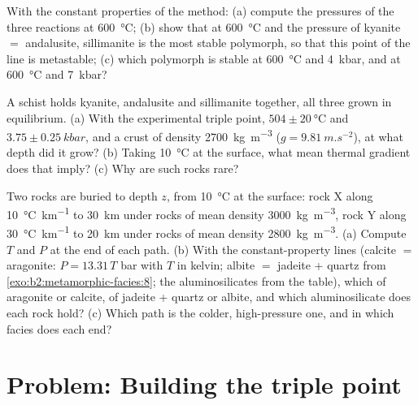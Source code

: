\begin{exercise}[$\star\star\star$]\label{exo:b2:metamorphic-facies:10}
With the constant properties of the method: (a) compute the pressures of the three
reactions at \qty{600}{\celsius}; (b) show that at \qty{600}{\celsius} and the pressure of
kyanite $=$ andalusite, sillimanite is the most stable polymorph, so that this point of
the line is metastable; (c) which polymorph is stable at \qty{600}{\celsius} and
\qty{4}{kbar}, and at \qty{600}{\celsius} and \qty{7}{kbar}?
\end{exercise}

\begin{exercise}[$\star\star\star$]\label{exo:b2:metamorphic-facies:11}
A schist holds kyanite, andalusite and sillimanite together, all three grown in
equilibrium. (a) With the experimental triple point, $504 \pm \qty{20}{\celsius}$ and
$3.75 \pm \qty{0.25}{kbar}$, and a crust of density \qty{2700}{kg.m^{-3}} ($g =
\qty{9.81}{m.s^{-2}}$), at what depth did it grow? (b) Taking \qty{10}{\celsius} at the
surface, what mean thermal gradient does that imply? (c) Why are such rocks rare?
\end{exercise}

\begin{exercise}[$\star\star\star$]\label{exo:b2:metamorphic-facies:12}
Two rocks are buried to depth $z$, from \qty{10}{\celsius} at the surface: rock X along
\qty{10}{\celsius.km^{-1}} to \qty{30}{km} under rocks of mean density
\qty{3000}{kg.m^{-3}}, rock Y along \qty{30}{\celsius.km^{-1}} to \qty{20}{km} under rocks
of mean density \qty{2800}{kg.m^{-3}}. (a) Compute $T$ and $P$ at the end of each path.
(b) With the constant-property lines (calcite $=$ aragonite: $P = 13.31\,T$ bar with $T$
in kelvin; albite $=$ jadeite + quartz from \cref{exo:b2:metamorphic-facies:8}; the aluminosilicates from the
table), which of aragonite or calcite, of jadeite + quartz or albite, and which
aluminosilicate does each rock hold? (c) Which path is the colder, high-pressure one, and in which facies does each end?
\end{exercise}

\section{Problem: Building the triple point}

